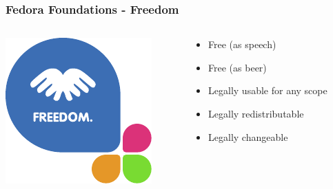\documentclass[t,aspectratio=169]{beamer}
\begin{document}
\begin{frame}
    \frametitle{Fedora Foundations - Freedom}
    \begin{columns}[T] %
        \begin{column}{.5\textwidth}
            \hfill\includegraphics[height=0.6\textheight]{foundations_expand_1_freedom.pdf}
        \end{column}
        \begin{column}{.5\textwidth}
            \begin{itemize}
                \item<2-> Free (as speech)
                \item<3-> Free (as beer)
                \item<4-> Legally usable for any scope
                \item<5-> Legally redistributable
                \item<6-> Legally changeable
            \end{itemize}
        \end{column}
    \end{columns}
\end{frame}
\end{document}
